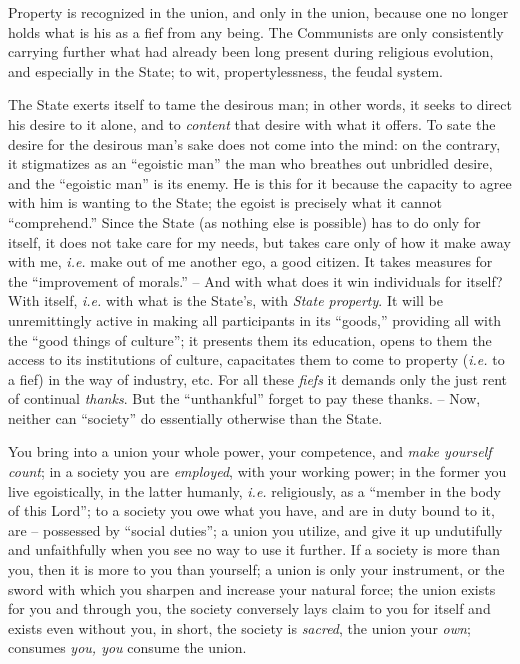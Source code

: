 Property is recognized in the union, and only in the union, because one no 
longer holds what is his as a fief from any being. The Communists are only 
consistently carrying further what had already been long present during 
religious evolution, and especially in the State; to wit, propertylessness, 
the feudal system.

The State exerts itself to tame the desirous man; in other words, it seeks to 
direct his desire to it alone, and to \textit{content} that desire with what 
it offers. To sate the desire for the desirous man's sake does not come into 
the mind: on the contrary, it stigmatizes as an ``egoistic man'' the man who 
breathes out unbridled desire, and the ``egoistic man'' is its enemy. He is 
this for it because the capacity to agree with him is wanting to the State; 
the egoist is precisely what it cannot ``comprehend.'' Since the State (as 
nothing else is possible) has to do only for itself, it does not take care for 
my needs, but takes care only of how it make away with me, \textit{i.e.} make 
out of me another ego, a good citizen. It takes measures for the 
``improvement of morals.'' -- And with what does it win individuals for 
itself? With itself, \textit{i.e.} with what is the State's, with 
\textit{State property}. It will be unremittingly active in making all 
participants in its ``goods,'' providing all with the ``good things of 
culture''; it presents them its education, opens to them the access to its 
institutions of culture, capacitates them to come to property (\textit{i.e.} 
to a fief) in the way of industry, etc. For all these \textit{fiefs} it 
demands only the just rent of continual \textit{thanks}. But the 
``unthankful'' forget to pay these thanks. -- Now, neither can ``society'' 
do essentially otherwise than the State.

You bring into a union your whole power, your competence, and \textit{make 
yourself count}; in a society you are \textit{employed}, with your working 
power; in the former you live egoistically, in the latter humanly, 
\textit{i.e.} religiously, as a ``member in the body of this Lord''; to a 
society you owe what you have, and are in duty bound to it, are -- possessed 
by ``social duties''; a union you utilize, and give it up undutifully and 
unfaithfully when you see no way to use it further. If a society is more than 
you, then it is more to you than yourself; a union is only your instrument, or 
the sword with which you sharpen and increase your natural force; the union 
exists for you and through you, the society conversely lays claim to you for 
itself and exists even without you, in short, the society is \textit{sacred}, 
the union your \textit{own}; consumes \textit{you, you} consume the union.

